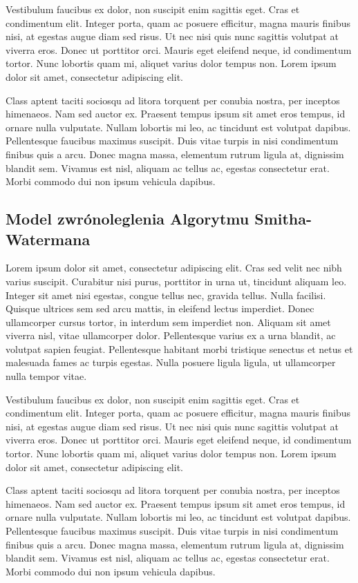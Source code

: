 \documentclass[a4paper,12pt]{article}
\begin{document}
Vestibulum faucibus ex dolor, non suscipit enim sagittis eget. Cras et condimentum elit. Integer porta, quam ac posuere efficitur, magna mauris finibus nisi, at egestas augue diam sed risus. Ut nec nisi quis nunc sagittis volutpat at viverra eros. Donec ut porttitor orci. Mauris eget eleifend neque, id condimentum tortor. Nunc lobortis quam mi, aliquet varius dolor tempus non. Lorem ipsum dolor sit amet, consectetur adipiscing elit.

Class aptent taciti sociosqu ad litora torquent per conubia nostra, per inceptos himenaeos. Nam sed auctor ex. Praesent tempus ipsum sit amet eros tempus, id ornare nulla vulputate. Nullam lobortis mi leo, ac tincidunt est volutpat dapibus. Pellentesque faucibus maximus suscipit. Duis vitae turpis in nisi condimentum finibus quis a arcu. Donec magna massa, elementum rutrum ligula at, dignissim blandit sem. Vivamus est nisl, aliquam ac tellus ac, egestas consectetur erat. Morbi commodo dui non ipsum vehicula dapibus.
\subsection*{Model zwrónoleglenia Algorytmu Smitha-Watermana}
Lorem ipsum dolor sit amet, consectetur adipiscing elit. Cras sed velit nec nibh varius suscipit. Curabitur nisi purus, porttitor in urna ut, tincidunt aliquam leo. Integer sit amet nisi egestas, congue tellus nec, gravida tellus. Nulla facilisi. Quisque ultrices sem sed arcu mattis, in eleifend lectus imperdiet. Donec ullamcorper cursus tortor, in interdum sem imperdiet non. Aliquam sit amet viverra nisl, vitae ullamcorper dolor. Pellentesque varius ex a urna blandit, ac volutpat sapien feugiat. Pellentesque habitant morbi tristique senectus et netus et malesuada fames ac turpis egestas. Nulla posuere ligula ligula, ut ullamcorper nulla tempor vitae.

Vestibulum faucibus ex dolor, non suscipit enim sagittis eget. Cras et condimentum elit. Integer porta, quam ac posuere efficitur, magna mauris finibus nisi, at egestas augue diam sed risus. Ut nec nisi quis nunc sagittis volutpat at viverra eros. Donec ut porttitor orci. Mauris eget eleifend neque, id condimentum tortor. Nunc lobortis quam mi, aliquet varius dolor tempus non. Lorem ipsum dolor sit amet, consectetur adipiscing elit.

Class aptent taciti sociosqu ad litora torquent per conubia nostra, per inceptos himenaeos. Nam sed auctor ex. Praesent tempus ipsum sit amet eros tempus, id ornare nulla vulputate. Nullam lobortis mi leo, ac tincidunt est volutpat dapibus. Pellentesque faucibus maximus suscipit. Duis vitae turpis in nisi condimentum finibus quis a arcu. Donec magna massa, elementum rutrum ligula at, dignissim blandit sem. Vivamus est nisl, aliquam ac tellus ac, egestas consectetur erat. Morbi commodo dui non ipsum vehicula dapibus.
\end{document}
